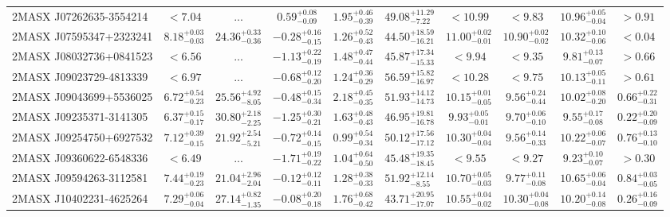\documentclass[onecolumn]{mn2e}
\begin{document}
\begin{landscape}
{\begin{center}
\begin{longtable}{lccccccccc}
2MASX J07262635-3554214 & $<7.04$ & ... & $0.59_{-0.09}^{+0.08}$ & $1.95_{-0.39}^{+0.46}$ &$49.08_{-7.22}^{+11.29}$ & $<10.99$ & $<9.83$ & $10.96_{-0.04}^{+0.05}$ & $>0.91$ \\
2MASX J07595347+2323241 & $8.18_{-0.03}^{+0.03}$ & $24.36_{-0.36}^{+0.33}$ & $-0.28_{-0.15}^{+0.16}$ & $1.26_{-0.43}^{+0.52}$ &$44.50_{-16.21}^{+18.59}$ & $11.00_{-0.01}^{+0.02}$ & $10.90_{-0.02}^{+0.02}$ & $10.32_{-0.06}^{+0.10}$ & $<0.04$ \\
2MASX J08032736+0841523 & $<6.56$ & ... & $-1.13_{-0.19}^{+0.22}$ & $1.48_{-0.44}^{+0.47}$ &$45.87_{-15.33}^{+17.34}$ & $<9.94$ & $<9.35$ & $9.81_{-0.07}^{+0.13}$ & $>0.66$ \\
2MASX J09023729-4813339 & $<6.97$ & ... & $-0.68_{-0.20}^{+0.12}$ & $1.24_{-0.29}^{+0.36}$ &$56.59_{-16.97}^{+15.82}$ & $<10.28$ & $<9.75$ & $10.13_{-0.11}^{+0.05}$ & $>0.61$ \\
2MASX J09043699+5536025 & $6.72_{-0.23}^{+0.54}$ & $25.56_{-8.05}^{+4.92}$ & $-0.48_{-0.34}^{+0.15}$ & $2.18_{-0.35}^{+0.45}$ &$51.93_{-14.73}^{+14.12}$ & $10.15_{-0.05}^{+0.01}$ & $9.56_{-0.44}^{+0.24}$ & $10.02_{-0.20}^{+0.08}$ & $0.66_{-0.31}^{+0.22}$ \\
2MASX J09235371-3141305 & $6.37_{-0.17}^{+0.15}$ & $30.80_{-2.25}^{+2.18}$ & $-1.25_{-0.21}^{+0.30}$ & $1.63_{-0.43}^{+0.48}$ &$46.95_{-16.78}^{+19.81}$ & $9.93_{-0.01}^{+0.05}$ & $9.70_{-0.10}^{+0.06}$ & $9.55_{-0.08}^{+0.17}$ & $0.22_{-0.09}^{+0.20}$ \\
2MASX J09254750+6927532 & $7.12_{-0.15}^{+0.39}$ & $21.92_{-5.21}^{+2.54}$ & $-0.72_{-0.15}^{+0.14}$ & $0.99_{-0.34}^{+0.54}$ &$50.12_{-17.12}^{+17.56}$ & $10.30_{-0.04}^{+0.04}$ & $9.56_{-0.33}^{+0.14}$ & $10.22_{-0.07}^{+0.06}$ & $0.76_{-0.10}^{+0.13}$ \\
2MASX J09360622-6548336 & $<6.49$ & ... & $-1.71_{-0.22}^{+0.19}$ & $1.04_{-0.50}^{+0.64}$ &$45.48_{-18.45}^{+19.35}$ & $<9.55$ & $<9.27$ & $9.23_{-0.07}^{+0.10}$ & $>0.30$ \\
2MASX J09594263-3112581 & $7.44_{-0.23}^{+0.19}$ & $21.04_{-2.04}^{+2.96}$ & $-0.12_{-0.11}^{+0.12}$ & $1.28_{-0.33}^{+0.38}$ &$51.92_{-8.55}^{+12.14}$ & $10.70_{-0.03}^{+0.05}$ & $9.77_{-0.08}^{+0.11}$ & $10.65_{-0.04}^{+0.06}$ & $0.84_{-0.05}^{+0.03}$ \\
2MASX J10402231-4625264 & $7.29_{-0.04}^{+0.06}$ & $27.14_{-1.35}^{+0.82}$ & $-0.08_{-0.18}^{+0.20}$ & $1.76_{-0.42}^{+0.68}$ &$43.71_{-17.07}^{+20.95}$ & $10.55_{-0.02}^{+0.04}$ & $10.30_{-0.08}^{+0.04}$ & $10.20_{-0.08}^{+0.14}$ & $0.26_{-0.09}^{+0.16}$ \\

\end{longtable}
\end{center}}
\end{landscape}
\end{document}
